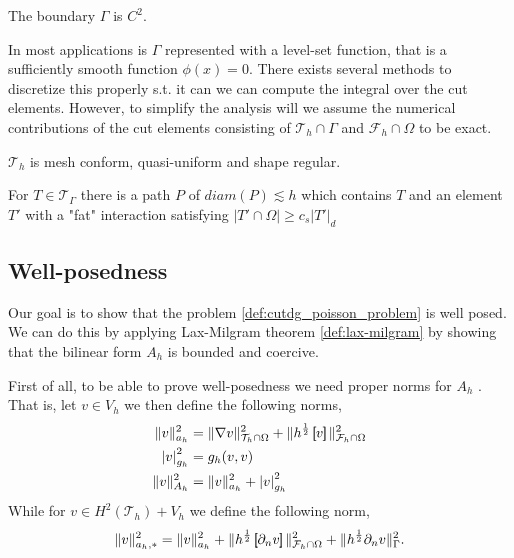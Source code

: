 \begin{assumption}[G1]
    \label{as:G1}
    The boundary $\Gamma $ is $C^{2}$.
\end{assumption}

\begin{remark}
In most applications is $\Gamma $ represented with a level-set function, that is a sufficiently smooth function $\phi ( x)  = 0$. There exists several methods to discretize this properly s.t. it can we can compute the integral over the cut elements.
    However, to simplify the analysis will we assume the numerical contributions of the cut elements consisting of $\mathcal{T}_{h} \cap \Gamma   $ and $\mathcal{F}_{h} \cap \Omega  $ to be exact.
\end{remark}


\begin{assumption}[G1]
    $\mathcal{T}_{h} $ is mesh conform, quasi-uniform and shape regular.
\end{assumption}

\begin{assumption}[G3]
    For $T \in \mathcal{T} _{\Gamma   }$ there is a path $P$ of $diam(P) \lesssim h$ which contains $T$ and an element $T'$ with a "fat" interaction satisfying $\left\lvert T' \cap \Omega  \right\rvert \ge c_{s} \left\lvert T'  \right\rvert _{d}$
\end{assumption}


\subsection{Well-posedness}%
\label{sub:well_posedness}

Our goal is to show that the problem \ref{def:cutdg_poisson_problem} is well posed. We can do this by applying Lax-Milgram theorem \ref{def:lax-milgram} by showing that the bilinear form $A_{h}$ is bounded and coercive.

First of all, to be able to prove well-posedness we need proper norms for $A_{h}$ .
That is, let $v \in V_{h}$ we then define the following norms,
\[
\begin{split}
    \| v \|_{ a_{h} }^{ 2 }  & = \| \nabla v \|_{ \mathcal{T} _{h} \cap \Omega  }^{ 2 } + \| h^{\frac{1}{2}} \left[\!\!\left[  v  \right]\!\!\right]   \|_{ \mathcal{F} _{h} \cap \Omega   }^2 \\
    \left\lvert v \right\rvert _{g_{h}}^{2} & = g_{h}( v,v)  \\
    \| v \|_{ A_{h} }^{ 2 } &= \| v \|_{ a_{h} }^{ 2 } + \left\lvert v \right\rvert_{g_{h}}^{2}     \\
\end{split}
\]
While for $v \in H^2( \mathcal{T} _{h}) + V_{h}$ we define the following norm,\[
\| v \|_{ a_{h},* }^{ 2 } = \| v \|_{ a_{h} }^{ 2 } +   \| h^{\frac{1}{2}} \left[\!\!\left[  \partial _{n} v  \right]\!\!\right]    \|_{  \mathcal{F} _{h} \cap \Omega }^{  2} + \| h^{\frac{1}{2}} \partial _{n} v \|_{ \Gamma  }^{ 2 }.
\]

